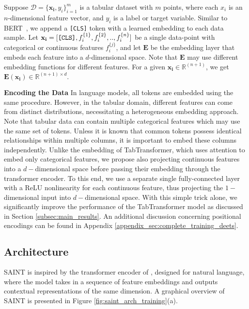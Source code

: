 Suppose $\mathcal{D} = \{\mathbf{x_i},y_i\}_{i=1}^m$ is a tabular dataset with $m$ points, where each ${x_i}$ is an $n$-dimensional feature vector, and ${y_i}$ is a label or target variable. Similar to BERT~\citep{devlin2018bert}, we append a \verb|[CLS]| token with a learned embedding to each data sample. Let $\mathbf{x_i} = [\verb|[CLS]|, f_i^{\{1\}}, f_i^{\{2\}},  ..,f_i^{\{n\}}]$ be a single data-point with categorical or continuous features $f_i^{\{j\}}$, and let $\mathbf{E}$ be the embedding layer that embeds each feature into a $d$-dimensional space.  Note that $\mathbf{E}$ may use different embedding functions for different features. For a given $\mathbf{x_i} \in \mathbb{R}^{(n+1)}$, we get $\mathbf{E}(\mathbf{x_i}) \in \mathbb{R}^{(n+1) \times d}$.

\textbf{Encoding the Data} In language models, all tokens are embedded using the same procedure. However, in the tabular domain, different features can come from distinct distributions, necessitating a heterogeneous embedding approach.  Note that tabular data can contain multiple categorical features which may use the same set of tokens. Unless it is known that common tokens possess identical relationships within multiple columns, it is important to embed these columns independently.  Unlike the embedding of TabTransformer\cite{huang2020tabtransformer}, which uses attention to embed only categorical features, we propose also projecting continuous features into a $d-$dimensional space before passing their embedding through the transformer encoder. To this end, we use a separate single fully-connected layer with a ReLU nonlinearity for each continuous feature, thus projecting the $1-$dimensional input into $d-$dimensional space. With this simple trick alone, we significantly improve the performance of the TabTransformer model as discussed in Section \ref{subsec:main_results}. An additional discussion concerning positional encodings can be found in Appendix \ref{appendix_sec:complete_training_deets}.

\subsection{Architecture}

SAINT is inspired by the transformer encoder of \citet{vaswani2017attention}, designed for natural language, where the model takes in a sequence of feature embeddings and outputs contextual representations of the same dimension. A graphical overview of SAINT is presented in Figure \ref{fig:saint_arch_training}(a).

